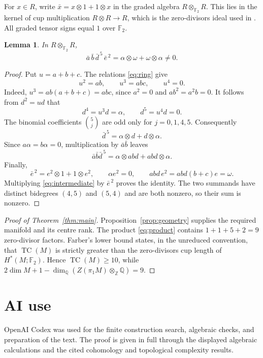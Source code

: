 \documentclass[11pt]{amsart}
\newcommand{\TC}{\operatorname{TC}}
\newcommand{\F}{\mathbb F_2}
\newcommand{\Z}{\mathbb Z}
\newcommand{\Q}{\mathbb Q}
\newtheorem{lemma}[theorem]{Lemma}
\begin{document}
For $x\in R$, write $\bar x=x\otimes1+1\otimes x$ in the graded algebra
$R\otimes_{\F}R$. This lies in the kernel of cup multiplication
$R\otimes R\to R$, which is the zero-divisors ideal used in
\cite[Definition~6]{Farber}. All graded tensor signs equal $1$ over $\F$.

\begin{lemma}\label{lem:product}
In $R\otimes_{\F}R$,
\begin{equation}\label{eq:product}
 \bar a\,\bar b\,\bar d^{\,5}\,\bar e^{\,2}
 =\alpha\otimes\omega+\omega\otimes\alpha\neq0.
\end{equation}
\end{lemma}
\begin{proof}
Put $u=a+b+c$. The relations \eqref{eq:ring} give
\[
 u^2=ab,\qquad u^3=abc,\qquad u^4=0.
\]
Indeed, $u^3=ab(a+b+c)=abc$, since $a^2=0$ and $ab^2=a^2b=0$.
It follows from $d^2=ud$ that
\[
 d^4=u^3d=\alpha,\qquad d^5=u^4d=0.
\]
The binomial coefficients $\binom5j$ are odd only for $j=0,1,4,5$.
Consequently
\[
 \bar d^{\,5}=\alpha\otimes d+d\otimes\alpha.
\]
Since $a\alpha=b\alpha=0$, multiplication by $\bar a\bar b$ leaves
\begin{equation}\label{eq:intermediate}
 \bar a\bar b\bar d^{\,5}
 =\alpha\otimes abd+abd\otimes\alpha.
\end{equation}
Finally,
\[
 \bar e^{\,2}=e^2\otimes1+1\otimes e^2,
 \qquad \alpha e^2=0,
 \qquad abd\,e^2=abd(b+c)e=\omega.
\]
Multiplying \eqref{eq:intermediate} by $\bar e^{\,2}$ proves the identity.
The two summands have distinct bidegrees $(4,5)$ and $(5,4)$ and are both
nonzero, so their sum is nonzero.
\end{proof}

\begin{proof}[Proof of Theorem~\ref{thm:main}]
Proposition~\ref{prop:geometry} supplies the required manifold and its centre
rank. The product \eqref{eq:product} contains $1+1+5+2=9$ zero-divisor
factors. Farber's lower bound \cite[Theorem~7]{Farber} states, in the
unreduced convention, that $\TC(M)$ is strictly greater than the
zero-divisors cup length of $H^*(M;\F)$. Hence $\TC(M)\geq10$, while
$2\dim M+1-\dim_{\Q}(Z(\pi_1M)\otimes_{\Z}\Q)=9$.
\end{proof}

\section*{AI use}
OpenAI Codex was used for the finite construction search, algebraic checks,
and preparation of the text. The proof is given in full through the displayed
algebraic calculations and the cited cohomology and topological complexity results.
\end{document}

